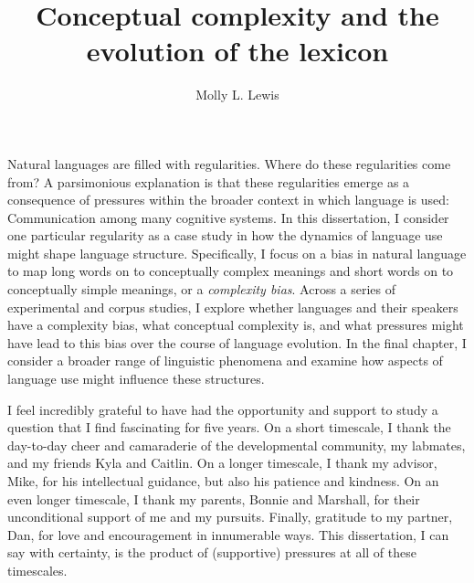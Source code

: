 \documentclass[12pt]{report}
\begin{document}
\title{Conceptual complexity and the evolution of the lexicon}
\author{Molly L. Lewis}
 
\beforepreface 
{}
Natural languages are filled with regularities. Where do these regularities come from? A parsimonious explanation is that these regularities emerge as a consequence of pressures within the broader context in which language is used: Communication among many cognitive systems. In this dissertation, I consider one particular regularity as a case study in how the dynamics of language use might shape language structure. Specifically, I focus on a bias in natural language to map long words on to conceptually complex meanings and short words on to conceptually simple meanings, or a {\it complexity bias}. Across a series of experimental and corpus studies, I explore whether languages and their speakers have a complexity bias, what conceptual complexity is, and what pressures might have lead to this bias over the course of language evolution. In the final chapter, I consider a broader range of linguistic phenomena and examine how aspects of language use might influence these structures. 

I feel incredibly grateful to have had the opportunity and support to study a question that I find fascinating for five years. On a short timescale, I thank the day-to-day cheer and camaraderie of the developmental community, my labmates, and my friends Kyla and Caitlin. On a longer timescale, I thank my advisor, Mike, for his intellectual guidance, but also his patience and kindness. On an even longer timescale, I thank my parents, Bonnie and Marshall, for their unconditional support of me and my pursuits. Finally, gratitude to my partner, Dan, for love and encouragement in innumerable ways. This dissertation, I can say with certainty, is the product of (supportive) pressures at all of these timescales.  


\afterpreface











\onlinesignature
\end{document}
